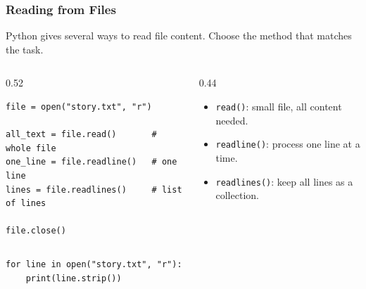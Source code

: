 \documentclass[aspectratio=169,10pt]{beamer}
\newcommand{\codeword}[1]{\texttt{#1}}
\begin{document}
\begin{frame}[fragile]
\frametitle{Reading from Files}
\small
Python gives several ways to read file content. Choose the method that matches the task.

\vspace{0.15cm}
\begin{columns}[T,totalwidth=0.96\textwidth]
\begin{column}{0.52\textwidth}
\begin{lstlisting}[style=pycode]
file = open("story.txt", "r")

all_text = file.read()       # whole file
one_line = file.readline()   # one line
lines = file.readlines()     # list of lines

file.close()
\end{lstlisting}
\end{column}
\begin{column}{0.44\textwidth}
\begin{tcolorbox}[lecturebox,title=When to use what]
\begin{itemize}\setlength\itemsep{0.08cm}
  \item \codeword{read()}: small file, all content needed.
  \item \codeword{readline()}: process one line at a time.
  \item \codeword{readlines()}: keep all lines as a collection.
\end{itemize}
\end{tcolorbox}
\end{column}
\end{columns}

\vspace{0.1cm}
\begin{tcolorbox}[lecturebox,title=Common pattern]
\begin{lstlisting}[style=pycodesmall]
for line in open("story.txt", "r"):
    print(line.strip())
\end{lstlisting}
\end{tcolorbox}
\end{frame}
\end{document}
